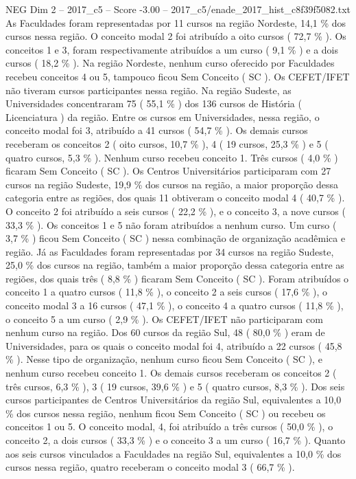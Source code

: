 \begin{textsample}{NEG Dim 2 – 2017\_c5 – Score -3.00 – 2017\_c5/enade\_2017\_hist\_c8f39f5082.txt}
As Faculdades foram representadas por 11 cursos na região Nordeste, 14,1 \% dos cursos nessa região.
O conceito modal 2 foi atribuído a oito cursos ( 72,7 \% ).
Os conceitos 1 e 3, foram respectivamente atribuídos a um curso ( 9,1 \% ) e a dois cursos ( 18,2 \% ).
Na região Nordeste, nenhum curso oferecido por Faculdades recebeu conceitos 4 ou 5, tampouco ficou Sem Conceito ( SC ).
Os CEFET/IFET não tiveram cursos participantes nessa região.
Na região Sudeste, as Universidades concentraram 75 ( 55,1 \% ) dos 136 cursos de História ( Licenciatura ) da região.
Entre os cursos em Universidades, nessa região, o conceito modal foi 3, atribuído a 41 cursos ( 54,7 \% ).
Os demais cursos receberam os conceitos 2 ( oito cursos, 10,7 \% ), 4 ( 19 cursos, 25,3 \% ) e 5 ( quatro cursos, 5,3 \% ).
Nenhum curso recebeu conceito 1.
Três cursos ( 4,0 \% ) ficaram Sem Conceito ( SC ).
Os Centros Universitários participaram com 27 cursos na região Sudeste, 19,9 \% dos cursos na região, a maior proporção dessa categoria entre as regiões, dos quais 11 obtiveram o conceito modal 4 ( 40,7 \% ).
O conceito 2 foi atribuído a seis cursos ( 22,2 \% ), e o conceito 3, a nove cursos ( 33,3 \% ).
Os conceitos 1 e 5 não foram atribuídos a nenhum curso.
Um curso ( 3,7 \% ) ficou Sem Conceito ( SC ) nessa combinação de organização acadêmica e região.
Já as Faculdades foram representadas por 34 cursos na região Sudeste, 25,0 \% dos cursos na região, também a maior proporção dessa categoria entre as regiões, dos quais três ( 8,8 \% ) ficaram Sem Conceito ( SC ).
Foram atribuídos o conceito 1 a quatro cursos ( 11,8 \% ), o conceito 2 a seis cursos ( 17,6 \% ), o conceito modal 3 a 16 cursos ( 47,1 \% ), o conceito 4 a quatro cursos ( 11,8 \% ), o conceito 5 a um curso ( 2,9 \% ).
Os CEFET/IFET não participaram com nenhum curso na região.
Dos 60 cursos da região Sul, 48 ( 80,0 \% ) eram de Universidades, para os quais o conceito modal foi 4, atribuído a 22 cursos ( 45,8 \% ).
Nesse tipo de organização, nenhum curso ficou Sem Conceito ( SC ), e nenhum curso recebeu conceito 1.
Os demais cursos receberam os conceitos 2 ( três cursos, 6,3 \% ), 3 ( 19 cursos, 39,6 \% ) e 5 ( quatro cursos, 8,3 \% ).
Dos seis cursos participantes de Centros Universitários da região Sul, equivalentes a 10,0 \% dos cursos nessa região, nenhum ficou Sem Conceito ( SC ) ou recebeu os conceitos 1 ou 5.
O conceito modal, 4, foi atribuído a três cursos ( 50,0 \% ), o conceito 2, a dois cursos ( 33,3 \% ) e o conceito 3 a um curso ( 16,7 \% ).
Quanto aos seis cursos vinculados a Faculdades na região Sul, equivalentes a 10,0 \% dos cursos nessa região, quatro receberam o conceito modal 3 ( 66,7 \% ).

\end{textsample}
